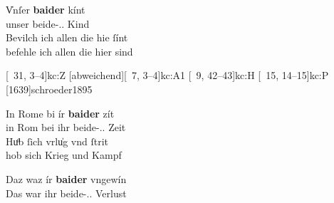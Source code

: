 
\begin{exe}
\ex \label{ex:k_beider}
	\begin{xlist}
	\ex \label{ex:k_beider_1}
		\gll V̍nſer \textbf{baider} kínt \\
			unser beide-\Gen.\Pl.\St{} Kind \\
	\sn \gll Bevilch ich allen die hie ſínt \\
			befehle ich allen die hier sind \\
		\begin{taggedline}{\parencites%
			[\pno~9\rb, 25--26]{kc:K}[vgl.]%
			[\pno~8\vb, 27--28]{kc:C1}%
			[\pno~31\va, 3--4]{kc:Z}%
			[abweichend][\pno~7\va, 3--4]{kc:A1}%
			[\pno~9\va, 42--43]{kc:H}%
			[\pno~15\va, 14--15]{kc:P}%
			[1639]{schroeder1895}
		}
		\trans {}
		\end{taggedline}

	\ex \label{ex:k_beider_2}
		\gll In Rome bi ír \textbf{baider} zít \\
			in Rom bei ihr beide-\Gen.\Pl.\St{} Zeit \\
	\sn \gll Huͦb ſich vrlu̍g vnd ſtrit \\
			hob sich Krieg und Kampf \\
		\begin{taggedline}{\parencites
			[\pno~28\vb, 36--37]{kc:K}[vgl.]%
			[\pno~93\va, 26--\pno~94\ra, 1]{kc:Z}[abweichend]%
			[\pno~14\va, 49--50]{kc:B1}%
			[\pno~24\ra, 30--31]{kc:VB}%
			[\pno~42\ra, 17--18]{kc:P}%
			[\pno~20\vb, 9--10]{kc:A1}%
			[\pno~36\rb, 6--7]{kc:M}%
			[\pno~28\rb, 39--40]{kc:H}%
			[4837--4838]{schroeder1895}%
		}
		\trans {}
		\end{taggedline}

	\ex \label{ex:k_beider_3}
		\gll Daz waz ír \textbf{baider} vngewín \\
			Das war ihr beide-\Gen.\Pl.\St{} Verlust \\
		\begin{taggedline}{\parencites%
			[\pno~103\vb, 27]{kc:K}[vgl.]
			[\pno~91\va, 10]{kc:C1}%
			[\pno~60\va, 34]{kc:VC}%
			[\pno~352\ra, 6]{kc:Z}%
			[208]{schroeder1895}%
		}
		\trans {}
		\end{taggedline}
	\end{xlist}
\end{exe}

